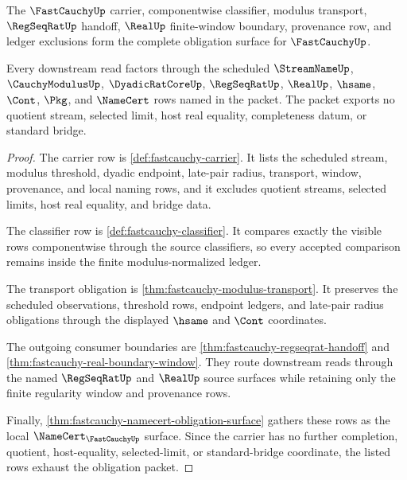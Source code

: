 \begin{theorem}
\label{thm:fastcauchy-obligation-closure-packet}
The $\FastCauchyUp$ carrier, componentwise classifier, modulus transport, $\RegSeqRatUp$ handoff, $\RealUp$ finite-window boundary, provenance row, and ledger exclusions form the complete obligation surface for $\FastCauchyUp$.

Every downstream read factors through the scheduled $\StreamNameUp$, $\CauchyModulusUp$, $\DyadicRatCoreUp$, $\RegSeqRatUp$, $\RealUp$, $\hsame$, $\Cont$, $\Pkg$, and $\NameCert$ rows named in the packet. The packet exports no quotient stream, selected limit, host real equality, completeness datum, or standard bridge.
\end{theorem}
\begin{proof}
The carrier row is \autoref{def:fastcauchy-carrier}. It lists the scheduled stream, modulus threshold, dyadic endpoint, late-pair radius, transport, window, provenance, and local naming rows, and it excludes quotient streams, selected limits, host real equality, and bridge data.

The classifier row is \autoref{def:fastcauchy-classifier}. It compares exactly the visible rows componentwise through the source classifiers, so every accepted comparison remains inside the finite modulus-normalized ledger.

The transport obligation is \autoref{thm:fastcauchy-modulus-transport}. It preserves the scheduled observations, threshold rows, endpoint ledgers, and late-pair radius obligations through the displayed $\hsame$ and $\Cont$ coordinates.

The outgoing consumer boundaries are \autoref{thm:fastcauchy-regseqrat-handoff} and \autoref{thm:fastcauchy-real-boundary-window}. They route downstream reads through the named $\RegSeqRatUp$ and $\RealUp$ source surfaces while retaining only the finite regularity window and provenance rows.

Finally, \autoref{thm:fastcauchy-namecert-obligation-surface} gathers these rows as the local $\NameCert_{\FastCauchyUp}$ surface. Since the carrier has no further completion, quotient, host-equality, selected-limit, or standard-bridge coordinate, the listed rows exhaust the obligation packet.
\end{proof}

